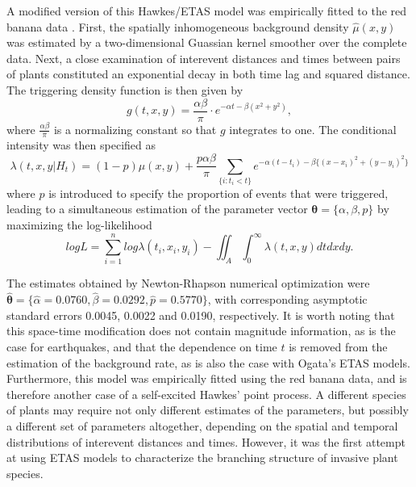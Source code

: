 \documentclass[11pt]{article}\usepackage[]{graphicx}\usepackage[]{color}
\begin{document}
A modified version of this Hawkes/ETAS model was empirically fitted to the red banana data \citep{Balderama12}. First, the spatially inhomogeneous background density $\hat\mu(x,y)$ was estimated by a two-dimensional Guassian kernel smoother over the complete data. Next, a close examination of interevent distances and times between pairs of plants constituted an exponential decay in both time lag and squared distance. The triggering density function is then given by
\begin{equation}\label{gredbanana}
g(t,x,y) = \dfrac{\alpha \beta}{\pi} \cdot e^{-\alpha t - \beta(x^2+y^2)},
\end{equation}
where $\frac{\alpha\beta}{\pi}$ is a normalizing constant so that $g$ integrates to one. The conditional intensity was then specified as 
\begin{equation}\label{etasplants}
\lambda(t,x,y | H_t) = (1-p)\mu(x,y) + \dfrac{p \alpha \beta}{\pi} \sum_{\{i:t_i < t\}} e^{-\alpha (t-t_i) - \beta\{(x-x_i)^2+(y-y_i)^2\}}
\end{equation}
where $p$ is introduced to specify the proportion of events that were triggered, leading to a simultaneous estimation of the parameter vector $\boldsymbol{\theta} = \{\alpha, \beta, p\}$ by maximizing the log-likelihood
\begin{equation}
logL = \sum_{i=1}^{n} log\lambda(t_i,x_i,y_i) - \iint_A \int_{0}^{\infty}\lambda(t,x,y)dtdxdy.
\end{equation}

The estimates obtained by Newton-Rhapson numerical optimization were $\boldsymbol{\hat\theta} = \{\hat\alpha = 0.0760, \hat\beta = 0.0292, \hat p = 0.5770\}$, with corresponding asymptotic standard errors 0.0045, 0.0022 and 0.0190, respectively. It is worth noting that this space-time modification does not contain magnitude information, as is the case for earthquakes, and that the dependence on time $t$ is removed from the estimation of the background rate, as is also the case with Ogata's ETAS models. Furthermore, this model was empirically fitted using the red banana data, and is therefore another case of a self-excited Hawkes' point process. A different species of plants may require not only different estimates of the parameters, but possibly a different set of parameters altogether, depending on the spatial and temporal distributions of interevent distances and times. However, it was the first attempt at using ETAS models to characterize the branching structure of invasive plant species.





\end{document}
